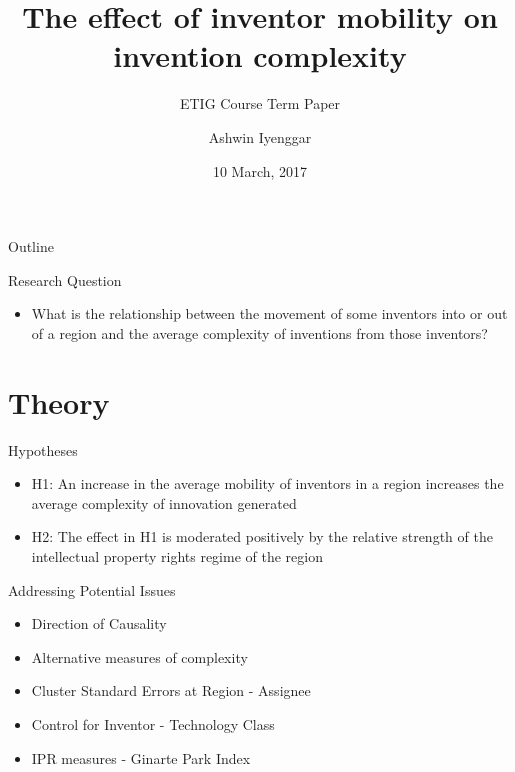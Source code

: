 \documentclass{beamer}
\title{The effect of inventor mobility on  invention complexity}
\subtitle{ETIG Course Term Paper}
\author{Ashwin Iyenggar}
\institute[Indian Institute of Management Bangalore] 
{
  Corporate Strategy and Policy\\
  Indian Institute of Management Bangalore
}
\date{10 March, 2017}
\begin{document}
\begin{frame}
  \titlepage
\end{frame}

\begin{frame}{Outline}
  \tableofcontents
\end{frame}

\begin{frame}{Research Question}{}
\begin{itemize}
\item{What is the relationship between the movement of some inventors into or out of a region and the average complexity of inventions from those inventors?}
\end{itemize}
\end{frame}

\section{Theory}
\begin{frame}{Hypotheses}{}
\begin{itemize}
\item{H1: An increase in the average mobility of inventors in a region increases the average complexity of  innovation generated}
\item{H2: The effect in H1 is moderated positively by the relative strength of the intellectual property rights regime of the region}
\end{itemize}
\end{frame}

\begin{frame}{Addressing Potential Issues}{}
\begin{itemize}
\item{Direction of Causality}
\item{Alternative measures of complexity }
\item{Cluster Standard Errors at Region - Assignee}
\item{Control for Inventor - Technology Class}
\item{IPR measures - Ginarte Park Index}
\end{itemize}
\end{frame}
\end{document}
